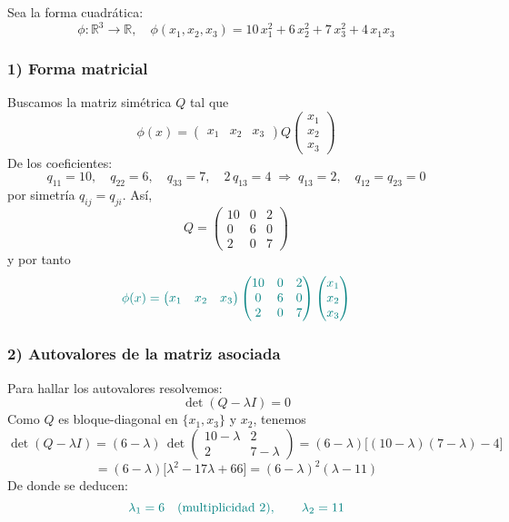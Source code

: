 \documentclass{article}
\begin{document}
Sea la forma cuadrática:
\[
\phi:\mathbb{R}^3\to\mathbb{R},
\quad
\phi(x_1,x_2,x_3) = 10\,x_1^2 + 6\,x_2^2 + 7\,x_3^2 + 4\,x_1x_3
\]

\subsubsection*{1) Forma matricial}

Buscamos la matriz simétrica \(Q\) tal que
\[
\phi(x)=
\begin{pmatrix}
x_1 & x_2 & x_3
\end{pmatrix}
Q
\begin{pmatrix}
x_1\\
x_2\\
x_3
\end{pmatrix}
\]
De los coeficientes:
\[
q_{11}=10,\quad
q_{22}=6,\quad
q_{33}=7,
\quad
2\,q_{13}=4\;\Longrightarrow\;q_{13}=2,
\quad
q_{12}=q_{23}=0
\]
por simetría \(q_{ij}=q_{ji}\). Así,
\[
Q=
\begin{pmatrix}
10 & 0 & 2\\[4pt]
0  & 6 & 0\\[4pt]
2  & 0 & 7
\end{pmatrix}
\]
y por tanto
\[
\color{teal}
\phi(x)=
\begin{pmatrix}
x_1 & x_2 & x_3
\end{pmatrix}
\begin{pmatrix}
10 & 0 & 2\\
0  & 6 & 0\\
2  & 0 & 7
\end{pmatrix}
\begin{pmatrix}
x_1\\
x_2\\
x_3
\end{pmatrix}
\]

\subsubsection*{2) Autovalores de la matriz asociada}

Para hallar los autovalores resolvemos:
\[
\det(Q - \lambda I)=0
\]
Como \(Q\) es bloque-diagonal en \(\{x_1,x_3\}\) y \(x_2\), tenemos
\[
\det(Q-\lambda I)
=(6-\lambda)\,\det\begin{pmatrix}
10-\lambda & 2\\[4pt]
2 & 7-\lambda
\end{pmatrix}
=(6-\lambda)\bigl[(10-\lambda)(7-\lambda)-4\bigr]
\]
\[
=(6-\lambda)\bigl[\lambda^2 -17\lambda +66\bigr]
=(6-\lambda)^2(\lambda-11)
\]
De donde se deducen:
\[
\color{teal}
\lambda_1 = 6\quad(\text{multiplicidad }2),
\qquad
\lambda_2 = 11
\]
\end{document}
